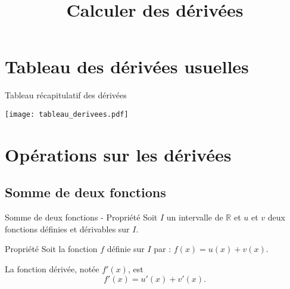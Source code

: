 \documentclass[12pt]{beamer}
\title{Calculer des dérivées}
\date{}
\begin{document}
\begin{frame}
\titlepage
\end{frame}

\begin{frame}
\tableofcontents
\end{frame}


\section{Tableau des dérivées usuelles}

\begin{frame}{Tableau récapitulatif des dérivées}
\begin{center}
\texttt{[image: tableau\_derivees.pdf]}
\end{center}
\end{frame}

\section{Opérations sur les dérivées}

\subsection{Somme de deux fonctions}

\begin{frame}{Somme de deux fonctions - Propriété}
Soit $I$ un intervalle de $\mathbb{R}$ et $u$ et $v$ deux fonctions définies et dérivables sur $I$.

\medskip
\begin{exampleblock}{Propriété}
Soit la fonction $f$ définie sur $I$ par : $f(x) = u(x) + v(x)$. \par 
La fonction dérivée, notée $f'(x)$, est \[ f'(x) = u'(x) + v'(x). \]
\end{exampleblock}
\end{frame}
\end{document}
